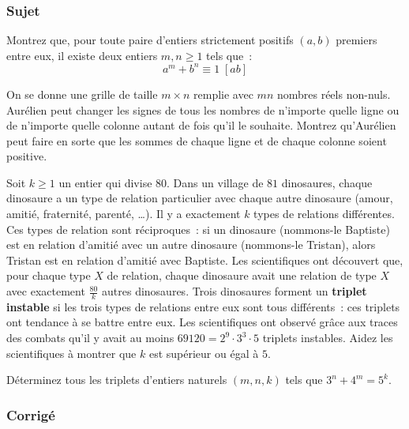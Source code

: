 \subsubsection{Sujet}

\begin{exo}
Montrez que, pour toute paire d'entiers strictement positifs $(a, b)$ premiers entre eux, il existe deux entiers $m, n \geq 1$ tels que~:
$$a^m + b^n \equiv 1 \; [ab]$$
\end{exo}

\begin{exo}
On se donne une grille de taille $m\times n$ remplie avec $mn$ nombres réels non-nuls. Aurélien peut changer les signes de tous les nombres de n'importe quelle ligne ou de n'importe quelle colonne autant de fois qu'il le souhaite. Montrez qu'Aurélien peut faire en sorte que les sommes de chaque ligne et de chaque colonne soient positive.
\end{exo}


\begin{exo}
Soit $k \geq 1$ un entier qui divise $80$.
Dans un village de $81$ dinosaures, chaque dinosaure a un type de relation particulier avec chaque autre dinosaure (amour, amitié, fraternité, parenté, \dots). Il y a exactement $k$ types de relations différentes.
Ces types de relation sont réciproques~: si un dinosaure (nommons-le Baptiste) est en relation d'amitié avec un autre dinosaure (nommons-le Tristan), alors Tristan est en relation d'amitié avec Baptiste. Les scientifiques ont découvert que, pour chaque type $X$ de relation, chaque dinosaure avait une relation de type $X$ avec exactement $\frac{80}{k}$ autres dinosaures.
Trois dinosaures forment un \textbf{triplet instable} si les trois types de relations entre eux sont tous différents~: ces triplets ont tendance à se battre entre eux.
Les scientifiques ont observé grâce aux traces des combats qu'il y avait au moins $69120 = 2^9\cdot 3^3\cdot 5$ triplets instables. Aidez les scientifiques à montrer que $k$ est supérieur ou égal à $5$.
\end{exo}


\begin{exo}
Déterminez tous les triplets d'entiers naturels $(m, n, k)$ tels que $3^n + 4^m = 5^k$.
\end{exo}


\subsubsection{Corrigé}

